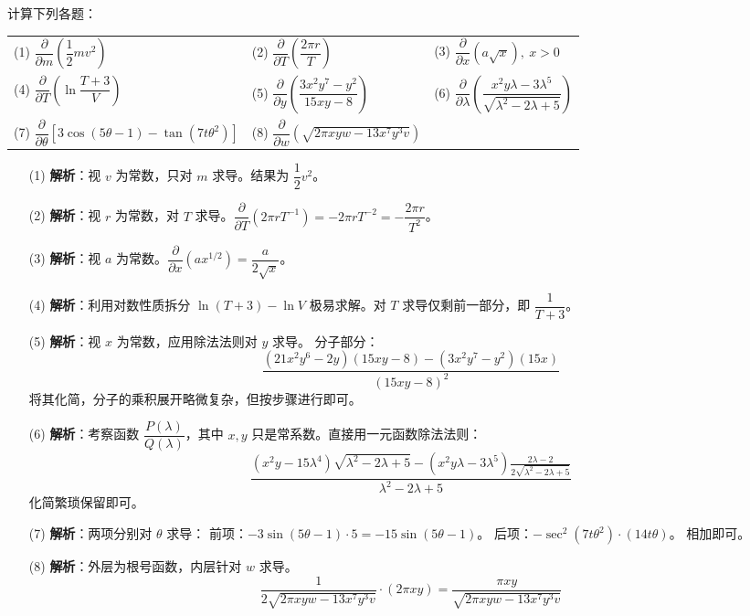 \documentclass[lang=cn,11pt]{elegantbook}
\begin{document}
\begin{exercise}[偏导数的计算与求导法则]
计算下列各题：\\
\begin{tabular}{p{}p{}p{}}
(1) $\dfrac{\partial}{\partial m}\left(\dfrac{1}{2}mv^2\right)$ & (2) $\dfrac{\partial}{\partial T}\left(\dfrac{2\pi r}{T}\right)$ & (3) $\dfrac{\partial}{\partial x}(a\sqrt{x}),\ x>0$ \\
(4) $\dfrac{\partial}{\partial T}\left(\ln\dfrac{T+3}{V}\right)$ & (5) $\dfrac{\partial}{\partial y}\left(\dfrac{3x^2y^7-y^2}{15xy-8}\right)$ & (6) $\dfrac{\partial}{\partial \lambda}\left(\dfrac{x^2y\lambda-3\lambda^5}{\sqrt{\lambda^2-2\lambda+5}}\right)$ \\
(7) $\dfrac{\partial}{\partial \theta}\left[3\cos(5\theta-1)-\tan(7t\theta^2)\right]$ & (8) $\dfrac{\partial}{\partial w}\left(\sqrt{2\pi xyw-13x^7y^3v}\right)$ & \\
\end{tabular}
\end{exercise}
\begin{solution}
\begin{enumerate}
  \item[(1)] \textbf{解析}：视 $v$ 为常数，只对 $m$ 求导。结果为 $\dfrac{1}{2}v^2$。
  \item[(2)] \textbf{解析}：视 $r$ 为常数，对 $T$ 求导。$\dfrac{\partial}{\partial T}\left(2\pi r T^{-1}\right) = -2\pi r T^{-2} = -\dfrac{2\pi r}{T^2}$。
  \item[(3)] \textbf{解析}：视 $a$ 为常数。$\dfrac{\partial}{\partial x}(ax^{1/2}) = \dfrac{a}{2\sqrt{x}}$。
  \item[(4)] \textbf{解析}：利用对数性质拆分 $\ln(T+3) - \ln V$ 极易求解。对 $T$ 求导仅剩前一部分，即 $\dfrac{1}{T+3}$。
  \item[(5)] \textbf{解析}：视 $x$ 为常数，应用除法法则对 $y$ 求导。
  分子部分：\[\dfrac{(21x^2y^6-2y)(15xy-8) - (3x^2y^7-y^2)(15x)}{(15xy-8)^2}\]将其化简，分子的乘积展开略微复杂，但按步骤进行即可。
  \item[(6)] \textbf{解析}：考察函数 $\dfrac{P(\lambda)}{Q(\lambda)}$，其中 $x, y$ 只是常系数。直接用一元函数除法法则：
  \[\dfrac{(x^2y - 15\lambda^4)\sqrt{\lambda^2-2\lambda+5} - (x^2y\lambda-3\lambda^5)\frac{2\lambda-2}{2\sqrt{\lambda^2-2\lambda+5}}}{\lambda^2-2\lambda+5}\]化简繁琐保留即可。
  \item[(7)] \textbf{解析}：两项分别对 $\theta$ 求导：
  前项：$-3\sin(5\theta-1)\cdot 5 = -15\sin(5\theta-1)$。
  后项：$-\sec^2(7t\theta^2) \cdot (14t\theta)$。
  相加即可。
  \item[(8)] \textbf{解析}：外层为根号函数，内层针对 $w$ 求导。
  \[\dfrac{1}{2\sqrt{2\pi xyw-13x^7y^3v}} \cdot (2\pi xy) = \dfrac{\pi xy}{\sqrt{2\pi xyw-13x^7y^3v}}\]
\end{enumerate}
\end{solution}
\end{document}
